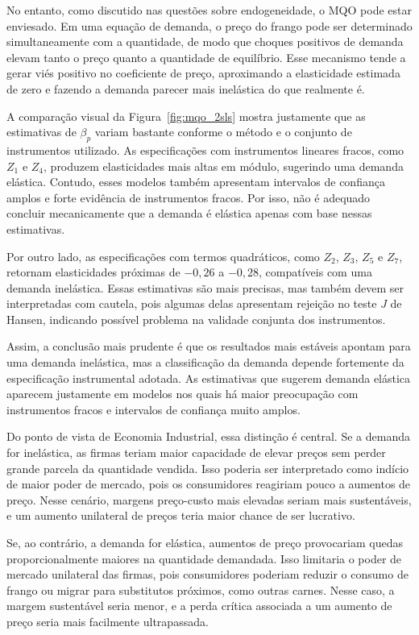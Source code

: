 \documentclass[12pt,a4paper]{article}
\begin{document}
\begin{enumerate}[label=\textbf{\arabic*.}]
No entanto, como discutido nas questões sobre endogeneidade, o MQO pode estar enviesado. Em uma equação de demanda, o preço do frango pode ser determinado simultaneamente com a quantidade, de modo que choques positivos de demanda elevam tanto o preço quanto a quantidade de equilíbrio. Esse mecanismo tende a gerar viés positivo no coeficiente de preço, aproximando a elasticidade estimada de zero e fazendo a demanda parecer mais inelástica do que realmente é.

A comparação visual da Figura~\ref{fig:mqo_2sls} mostra justamente que as estimativas de $\beta_p$ variam bastante conforme o método e o conjunto de instrumentos utilizado. As especificações com instrumentos lineares fracos, como $Z_1$ e $Z_4$, produzem elasticidades mais altas em módulo, sugerindo uma demanda elástica. Contudo, esses modelos também apresentam intervalos de confiança amplos e forte evidência de instrumentos fracos. Por isso, não é adequado concluir mecanicamente que a demanda é elástica apenas com base nessas estimativas.

Por outro lado, as especificações com termos quadráticos, como $Z_2$, $Z_3$, $Z_5$ e $Z_7$, retornam elasticidades próximas de $-0{,}26$ a $-0{,}28$, compatíveis com uma demanda inelástica. Essas estimativas são mais precisas, mas também devem ser interpretadas com cautela, pois algumas delas apresentam rejeição no teste $J$ de Hansen, indicando possível problema na validade conjunta dos instrumentos.

Assim, a conclusão mais prudente é que os resultados mais estáveis apontam para uma demanda inelástica, mas a classificação da demanda depende fortemente da especificação instrumental adotada. As estimativas que sugerem demanda elástica aparecem justamente em modelos nos quais há maior preocupação com instrumentos fracos e intervalos de confiança muito amplos.

Do ponto de vista de Economia Industrial, essa distinção é central. Se a demanda for inelástica, as firmas teriam maior capacidade de elevar preços sem perder grande parcela da quantidade vendida. Isso poderia ser interpretado como indício de maior poder de mercado, pois os consumidores reagiriam pouco a aumentos de preço. Nesse cenário, margens preço-custo mais elevadas seriam mais sustentáveis, e um aumento unilateral de preços teria maior chance de ser lucrativo.

Se, ao contrário, a demanda for elástica, aumentos de preço provocariam quedas proporcionalmente maiores na quantidade demandada. Isso limitaria o poder de mercado unilateral das firmas, pois consumidores poderiam reduzir o consumo de frango ou migrar para substitutos próximos, como outras carnes. Nesse caso, a margem sustentável seria menor, e a perda crítica associada a um aumento de preço seria mais facilmente ultrapassada.


\end{enumerate}
\end{document}
